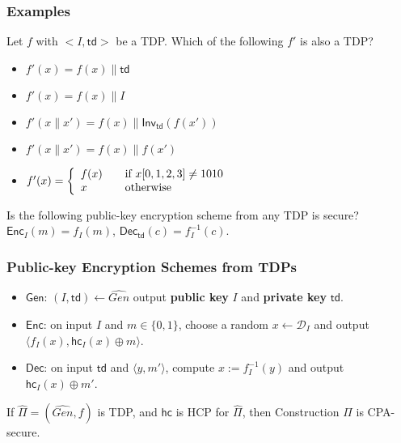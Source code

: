 \begin{frame}\frametitle{Examples}
\begin{exampleblock}{Let $f$ with $<I, \mathsf{td}>$ be a TDP. Which of the following $f'$ is also a TDP?}
\begin{itemize}
\item $f'(x) = f(x)\| \mathsf{td}$
\item $f'(x) = f(x) \| I$
\item $f'(x\|x') = f(x)\|\mathsf{Inv}_{\mathsf{td}}(f(x'))$
\item $f'(x\|x') = f(x)\|f(x')$
\item $ f'(x) = \left\{
  \begin{array}{l l}
    f(x) & \quad \text{if $x[0,1,2,3] \neq 1010$}\\
    x & \quad \text{otherwise}\\
  \end{array} \right. $
\end{itemize}
\end{exampleblock}
\begin{exampleblock}{Is the following public-key encryption scheme from any TDP is secure?}
$\mathsf{Enc}_{I}(m) = f_I(m)$, $\mathsf{Dec}_{\mathsf{td}}(c) = f^{-1}_I(c)$.
\end{exampleblock}
\end{frame}
\begin{frame}\frametitle{Public-key Encryption Schemes from TDPs}
\begin{construction}
\begin{itemize}
\item $\mathsf{Gen}$: $(I, \mathsf{td}) \gets \widehat{Gen}$ output \textbf{public key} $I$ and \textbf{private key} $\mathsf{td}$.
\item $\mathsf{Enc}$: on input $I$ and $m \in \{0,1\}$, choose a random $x\gets \mathcal{D}_I$ and output $\langle f_I(x), \mathsf{hc}_I(x)\oplus m \rangle$.
\item $\mathsf{Dec}$: on input $\mathsf{td}$ and $\langle y, m'\rangle$, compute $x:= f^{-1}_I(y)$ and output $\mathsf{hc}_I(x)\oplus m'$.
\end{itemize}
\end{construction}
\begin{theorem}
If $\widehat{\Pi}=(\widehat{Gen},f)$ is TDP, and $\mathsf{hc}$ is HCP for $\widehat{\Pi}$, then Construction $\Pi$ is CPA-secure.
\end{theorem}
\end{frame}
